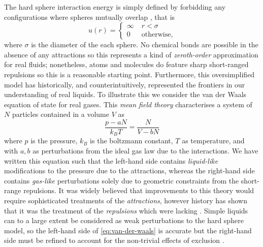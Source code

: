 \documentclass[11pt,twoside]{report}
\begin{document}
The hard sphere interaction energy is simply defined by forbidding any configurations where spheres mutually overlap%
,
that is
\begin{equation}\label{eq:hs-interaction}
  u(r) =
  \begin{cases}
    \infty & \; r < \sigma \\
    0 & \; \textrm{otherwise},
  \end{cases}
\end{equation}
where $\sigma$ is the diameter of the each sphere.
No chemical bonds are possible in the absence of any attractions so this represents a kind of \emph{zeroth-order} approximation for real fluids; nonetheless, atoms and molecules do feature sharp short-ranged repulsions so this is a reasonable starting point.
Furthermore, this oversimplified model has historically, and counterintuitively, represented the frontiers in our understanding of real liquids.
To illustrate this we consider the van der Waals equation of state for real gases.
This \emph{mean field theory} characterises a system of $N$ particles contained in a volume $V$ as
\begin{equation}\label{eq:van-der-waals}
  \frac{p - a N}{k_B T} = \frac{N}{V - b N}
\end{equation}
where $p$ is the pressure, $k_B$ is the boltzmann constant, $T$ as temperature, and with $a,b$ as perturbations from the ideal gas law due to the interactions.
We have written this equation such that the left-hand side contains \emph{liquid-like} modifications to the pressure due to the attractions, whereas the right-hand side contains \emph{gas-like} perturbations solely due to geometric constraints from the short-range repulsions.
It was widely believed that improvements to this theory would require sophisticated treatments of the \emph{attractions}, however history has shown that it was the treatment of the \emph{repulsions} which were lacking \cite{Santos2016}.
Simple liquids can to a large extent be considered as weak perturbations to the hard sphere model, so the left-hand side of \eqref{eq:van-der-waals} is accurate but the right-hand side must be refined to account for the non-trivial effects of exclusion \cite{Hansen2013}.

\end{document}
